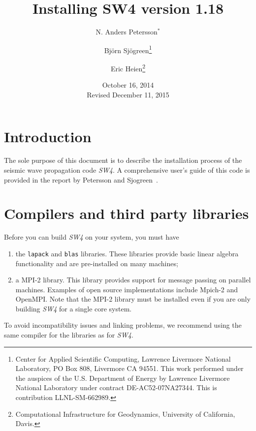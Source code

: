 \documentclass[11pt]{article}
\begin{document}
\title{Installing SW4 version 1.18}

\author{ N. Anders Petersson$^*$ \and Bj\"orn Sj\"ogreen\thanks{Center for Applied Scientific
    Computing, Lawrence Livermore National Laboratory, PO Box 808, Livermore CA 94551. This work
    performed under the auspices of the U.S. Department of Energy by Lawrence Livermore National
    Laboratory under contract DE-AC52-07NA27344. This is contribution LLNL-SM-662989.} \and Eric
  Heien\thanks{Computational Infrastructure for Geodynamics, University of California, Davis.}}
\date{October 16, 2014\\Revised December 11, 2015}
\maketitle




\tableofcontents

\section{Introduction}
The sole purpose of this document is to describe the installation process of the seismic wave
propagation code \emph{SW4}. A comprehensive user's guide of this code is provided in the report by
Petersson and Sjogreen~\cite{SW4-11}.

\section{Compilers and third party libraries}

Before you can build \emph{SW4} on your system, you must have
\begin{enumerate}
\item the \verb+lapack+ and \verb+blas+ libraries. These libraries provide basic linear algebra
  functionality and are pre-installed on many machines;
\item a MPI-2 library. This library provides support for message passing on parallel
  machines. Examples of open source implementations include Mpich-2 and OpenMPI. Note that the MPI-2
  library must be installed even if you are only building \emph{SW4} for a single core system.
\end{enumerate}
To avoid incompatibility issues and linking problems, we recommend using the same compiler for
the libraries as for \emph{SW4}.
\end{document}
